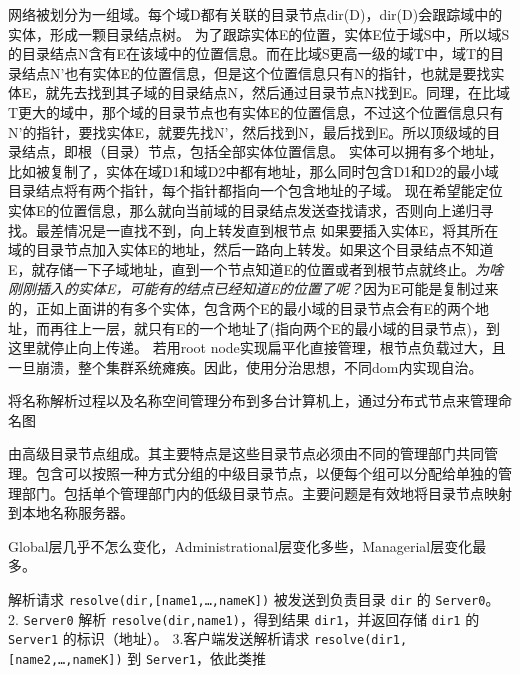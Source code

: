 \documentclass[twoside]{ctexart}
\begin{document}
\begin{multicols}{2}
   网络被划分为一组域。每个域D都有关联的目录节点dir(D)，dir(D)会跟踪域中的实体，形成一颗目录结点树。 为了跟踪实体E的位置，实体E位于域S中，所以域S的目录结点N含有E在该域中的位置信息。而在比域S更高一级的域T中，域T的目录结点N'也有实体E的位置信息，但是这个位置信息只有N的指针，也就是要找实体E，就先去找到其子域的目录结点N，然后通过目录节点N找到E。同理，在比域T更大的域中，那个域的目录节点也有实体E的位置信息，不过这个位置信息只有N'的指针，要找实体E，就要先找N'，然后找到N，最后找到E。所以顶级域的目录结点，即根（目录）节点，包括全部实体位置信息。 实体可以拥有多个地址，比如被复制了，实体在域D1和域D2中都有地址，那么同时包含D1和D2的最小域目录结点将有两个指针，每个指针都指向一个包含地址的子域。 现在希望能定位实体E的位置信息，那么就向当前域的目录结点发送查找请求，否则向上递归寻找。最差情况是一直找不到，向上转发直到根节点  如果要插入实体E，将其所在域的目录节点加入实体E的地址，然后一路向上转发。如果这个目录结点不知道E，就存储一下子域地址，直到一个节点知道E的位置或者到根节点就终止。\emph{为啥刚刚插入的实体E，可能有的结点已经知道E的位置了呢？}因为E可能是复制过来的，正如上面讲的有多个实体，包含两个E的最小域的目录节点会有E的两个地址，而再往上一层，就只有E的一个地址了(指向两个E的最小域的目录节点)，到这里就停止向上传递。  若用root node实现扁平化直接管理，根节点负载过大，且一旦崩溃，整个集群系统瘫痪。因此，使用分治思想，不同dom内实现自治。

   将名称解析过程以及名称空间管理分布到多台计算机上，通过分布式节点来管理命名图

  由高级目录节点组成。其主要特点是这些目录节点必须由不同的管理部门共同管理。包含可以按照一种方式分组的中级目录节点，以便每个组可以分配给单独的管理部门。包括单个管理部门内的低级目录节点。主要问题是有效地将目录节点映射到本地名称服务器。

  Global层几乎不怎么变化，Administrational层变化多些，Managerial层变化最多。

   解析请求 \texttt{resolve(dir,{[}name1,…,nameK{]})} 被发送到负责目录 \texttt{dir} 的 \texttt{Server0}。 2. \texttt{Server0} 解析 \texttt{resolve(dir,name1)}，得到结果 \texttt{dir1}，并返回存储 \texttt{dir1} 的 \texttt{Server1} 的标识（地址）。 3.客户端发送解析请求 \texttt{resolve(dir1,{[}name2,…,nameK{]})} 到 \texttt{Server1}，依此类推


\end{multicols}
\end{document}
